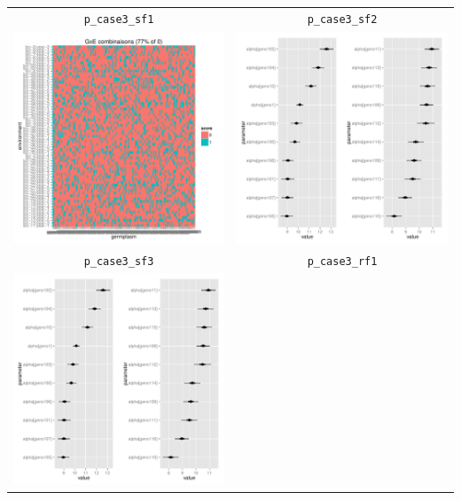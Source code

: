\documentclass{book}\usepackage[]{graphicx}\usepackage[]{color}
\newenvironment{knitrout}{}{} %
\begin{document}
\begin{center}
\begin{tabular}{cc}
\texttt{p\_case3\_sf1} & \texttt{p\_case3\_sf2} \\
\begin{knitrout}
\definecolor{shadecolor}{rgb}{0.969, 0.969, 0.969}\color{fgcolor}

{\centering \includegraphics[width=.4\textwidth]{figures/PPBstats_unnamed-chunk-33-1} 

}



\end{knitrout}
&
\begin{knitrout}
\definecolor{shadecolor}{rgb}{0.969, 0.969, 0.969}\color{fgcolor}

{\centering \includegraphics[width=.4\textwidth]{figures/PPBstats_unnamed-chunk-34-1} 

}



\end{knitrout}
\\
\texttt{p\_case3\_sf3} & \texttt{p\_case3\_rf1} \\
\begin{knitrout}
\definecolor{shadecolor}{rgb}{0.969, 0.969, 0.969}\color{fgcolor}

{\centering \includegraphics[width=.4\textwidth]{figures/PPBstats_unnamed-chunk-35-1} 

}
\end{knitrout}
\end{tabular}
\end{center}
\end{document}
